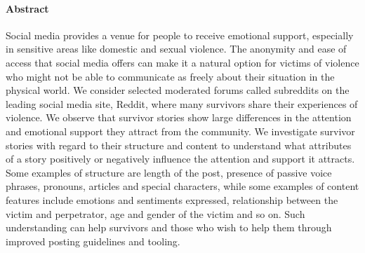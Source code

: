 \documentclass{article}
\newcommand{\ms}[1]{\textcolor{red}{\textsf{}{MS:~~#1}}}
\begin{document}
\paragraph{Abstract} 

Social media provides a venue for people to receive emotional support, especially in sensitive areas like domestic and sexual violence. 
The anonymity and ease of access that social media offers can make it a natural option for victims of violence who might not be able to communicate as freely about their situation in the physical world. 
We consider selected moderated forums called subreddits on the leading social media site, Reddit, where many survivors share their experiences of violence. 
We observe that survivor stories show large differences in the attention and emotional support they attract from the community. 
We investigate survivor stories with regard to their structure and content to understand what attributes of a story positively or negatively influence the attention and support it attracts. 
Some examples of structure are length of the post, presence of passive voice phrases, pronouns, articles and special characters, while some examples of content features include emotions and sentiments expressed, relationship between the victim and perpetrator, age and gender of the victim and so on.  
Such understanding can help survivors and those who wish to help them through improved posting guidelines and tooling. 
\end{document}
